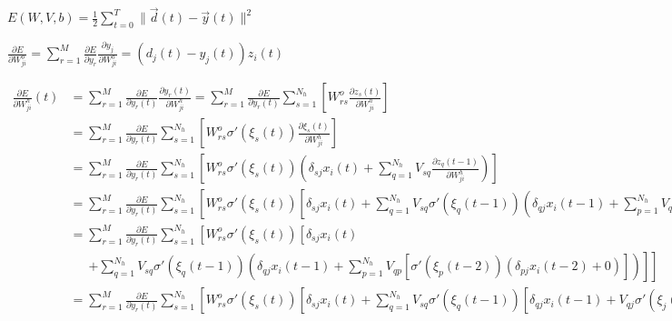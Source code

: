 \documentclass[multi={mymath},border=1pt]{standalone}
\newenvironment{mymath}{$\displaystyle}{$}
\begin{document}
\begin{mymath}
  E(W, V, b) = \frac{1}{2} \sum_{t=0}^T \| \vec{d}(t) - \vec{y}(t) \|^2
\end{mymath}

\begin{mymath}
  \frac{\partial E}{\partial W^o_{ji}} = \sum_{r=1}^M \frac{\partial E}{\partial y_r} \frac{\partial y_j}{\partial W^o_{ji}} = (d_j(t) - y_j(t)) z_i(t)
\end{mymath}

\begin{mymath}
  \begin{aligned}
    \frac{\partial E}{\partial W^h_{ji}}(t) &= \sum_{r=1}^M \frac{\partial E}{\partial y_r(t)} \frac{\partial y_r(t)}{\partial W^h_{ji}} = \sum_{r=1}^M \frac{\partial E}{\partial y_r(t)} \sum_{s=1}^{N_h} \left[ W^o_{rs} \frac{\partial z_s(t)}{\partial W^h_{ji}} \right] \\
    &= \sum_{r=1}^M \frac{\partial E}{\partial y_r(t)} \sum_{s=1}^{N_h} \left[ W^o_{rs} \sigma'(\xi_s(t)) \frac{\partial \xi_s(t)}{\partial W^h_{ji}} \right] \\
    &= \sum_{r=1}^M \frac{\partial E}{\partial y_r(t)} \sum_{s=1}^{N_h} \left[ W^o_{rs} \sigma'(\xi_s(t)) \left( \delta_{sj} x_i(t) + \sum_{q=1}^{N_h} V_{sq} \frac{\partial z_q(t-1)}{\partial W^h_{ji}} \right) \right] \\
    &= \sum_{r=1}^M \frac{\partial E}{\partial y_r(t)} \sum_{s=1}^{N_h} \left[ W^o_{rs} \sigma'(\xi_s(t)) \left[ \delta_{sj} x_i(t) + \sum_{q=1}^{N_h} V_{sq} \sigma'(\xi_q(t-1)) \left( \delta_{qj} x_i(t-1) + \sum_{p=1}^{N_h} V_{qp} \frac{\partial z_p(t-2)}{\partial W^h_{ji}} \right) \right] \right] \\
    &= \sum_{r=1}^M \frac{\partial E}{\partial y_r(t)} \sum_{s=1}^{N_h} \left[ W^o_{rs} \sigma'(\xi_s(t)) \left[ \delta_{sj} x_i(t) \right. \right. \\
    &\,\,\,\,\,\,\,\,\, \left. \left. + \sum_{q=1}^{N_h} V_{sq} \sigma'(\xi_q(t-1)) \left( \delta_{qj} x_i(t-1) + \sum_{p=1}^{N_h} V_{qp} \left[ \sigma'(\xi_p(t-2)) \left( \delta_{pj} x_i(t-2) + 0 \right) \right] \right) \right] \right] \\
    &= \sum_{r=1}^M \frac{\partial E}{\partial y_r(t)} \sum_{s=1}^{N_h} \left[ W^o_{rs} \sigma'(\xi_s(t)) \left[ \delta_{sj} x_i(t) + \sum_{q=1}^{N_h} V_{sq} \sigma'(\xi_q(t-1)) \left[ \delta_{qj} x_i(t-1) + V_{qj} \sigma'(\xi_j(t-2)) x_i(t-2) \right] \right] \right]
  \end{aligned}
\end{mymath}
\end{document}
